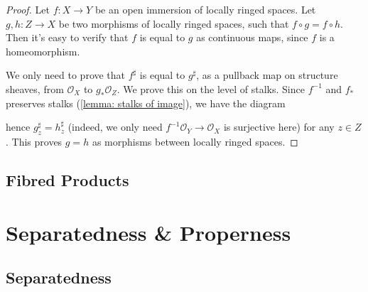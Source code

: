 \documentclass[11pt]{article}
\begin{document}
\begin{proof}
    Let $ f:X \to Y $ be an open immersion of locally ringed spaces. 
    Let $ g,h: Z \to X $ be two morphisms of locally ringed spaces, such that $ f\circ g = f \circ h $. 
    Then it's easy to verify that $ f $ is equal to $ g $ as continuous maps, since $ f $ is a homeomorphism. 
    
    We only need to prove that $ f^{\sharp} $ is equal to $ g^{\sharp} $, as a pullback map on structure sheaves, 
    from $ \mathscr{O}_{X} $ to $ g_{*}\mathscr{O}_{Z} $. We prove this on the level of stalks. 
    Since $ f^{-1} $ and $ f_{*} $ preserves stalks (\autoref{lemma: stalks of image}), we have the diagram 
    \begin{center}
    \end{center}
    hence $ g_{z}^{\sharp} = h_{z}^{\sharp} $ (indeed, we only need $ f^{-1}\mathscr{O}_{Y} \to \mathscr{O}_{X} $ is surjective here) 
    for any $ z \in Z $. This proves $ g = h $ as morphisms between locally ringed spaces. 
\end{proof}



\subsection{Fibred Products}

\begin{proposition}
    
\end{proposition}


\section{Separatedness \& Properness}

\subsection{Separatedness}
\end{document}
